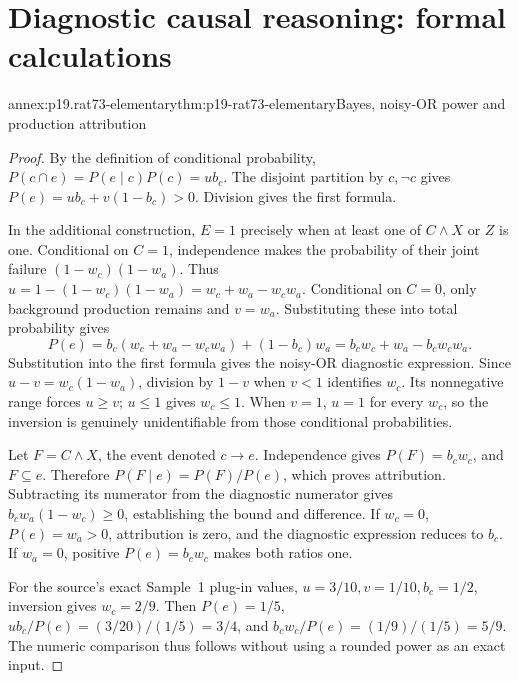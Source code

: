 \section{Diagnostic causal reasoning: formal calculations}
\label{annex:p19-rat73-calculations}

\begin{annexitem}{annex:p19.rat73-elementary}{thm:p19-rat73-elementary}{Bayes, noisy-OR power and production attribution}
\begin{proof}
By the definition of conditional probability,
\(P(c\cap e)=P(e\mid c)P(c)=ub_c\).
The disjoint partition by \(c,\neg c\) gives
\(P(e)=ub_c+v(1-b_c)>0\). Division gives the first formula.

In the additional construction, \(E=1\) precisely when at least one
of \(C\land X\) or \(Z\) is one. Conditional on \(C=1\),
independence makes the probability of their joint failure
\((1-w_c)(1-w_a)\). Thus
\(u=1-(1-w_c)(1-w_a)=w_c+w_a-w_cw_a\).
Conditional on \(C=0\), only background production remains and
\(v=w_a\). Substituting these into total probability gives
\[
 P(e)=b_c(w_c+w_a-w_cw_a)+(1-b_c)w_a
     =b_cw_c+w_a-b_cw_cw_a.
\]
Substitution into the first formula gives the noisy-OR diagnostic
expression. Since \(u-v=w_c(1-w_a)\), division by \(1-v\)
when \(v<1\) identifies \(w_c\). Its nonnegative range forces
\(u\geq v\); \(u\leq1\) gives \(w_c\leq1\).
When \(v=1\), \(u=1\) for every \(w_c\), so the inversion
is genuinely unidentifiable from those conditional probabilities.

Let \(F=C\land X\), the event denoted \(c\to e\).
Independence gives \(P(F)=b_cw_c\), and \(F\subseteq e\).
Therefore \(P(F\mid e)=P(F)/P(e)\), which proves attribution.
Subtracting its numerator from the diagnostic numerator gives
\(b_cw_a(1-w_c)\geq0\), establishing the bound and difference.
If \(w_c=0\), \(P(e)=w_a>0\), attribution is zero, and
the diagnostic expression reduces to \(b_c\).
If \(w_a=0\), positive \(P(e)=b_cw_c\) makes both ratios one.

For the source's exact Sample~1 plug-in values,
\(u=3/10,v=1/10,b_c=1/2\), inversion gives \(w_c=2/9\).
Then \(P(e)=1/5\), \(ub_c/P(e)=(3/20)/(1/5)=3/4\),
and \(b_cw_c/P(e)=(1/9)/(1/5)=5/9\).
The numeric comparison thus follows without using a rounded power
as an exact input.
\end{proof}
\end{annexitem}

